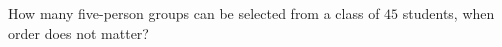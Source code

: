 How many five-person groups can be selected from a class of $45$ students, when order does not matter?
